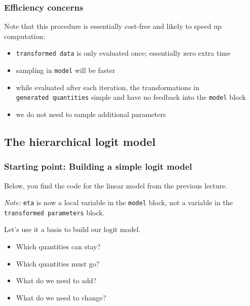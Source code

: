 \documentclass[
  11pt,
]{article}
\providecommand{\tightlist}{%
  \setlength{\itemsep}{0pt}\setlength{\parskip}{0pt}}
\begin{document}
\hypertarget{efficiency-concerns}{%
\subsubsection{Efficiency concerns}\label{efficiency-concerns}}

Note that this procedure is essentially cost-free and likely to speed up computation:

\begin{itemize}
\tightlist
\item
  \texttt{transformed\ data} is only evaluated once; essentially zero extra time
\item
  sampling in \texttt{model} will be faster
\item
  while evaluated after each iteration, the transformations in \texttt{generated\ quantities} simple and have no feedback into the \texttt{model} block
\item
  we do not need to sample additional parameters
\end{itemize}

\hypertarget{the-hierarchical-logit-model}{%
\subsection{The hierarchical logit model}\label{the-hierarchical-logit-model}}

\hypertarget{starting-point-building-a-simple-logit-model}{%
\subsubsection{Starting point: Building a simple logit model}\label{starting-point-building-a-simple-logit-model}}

Below, you find the code for the linear model from the previous lecture.

\emph{Note:} \texttt{eta} is now a local variable in the \texttt{model} block, not a variable in the \texttt{transformed\ parameters} block.

Let's use it a basis to build our logit model.

\begin{itemize}
\tightlist
\item
  Which quantities can stay?
\item
  Which quantities must go?
\item
  What do we need to add?
\item
  What do we need to change?
\end{itemize}
\end{document}
